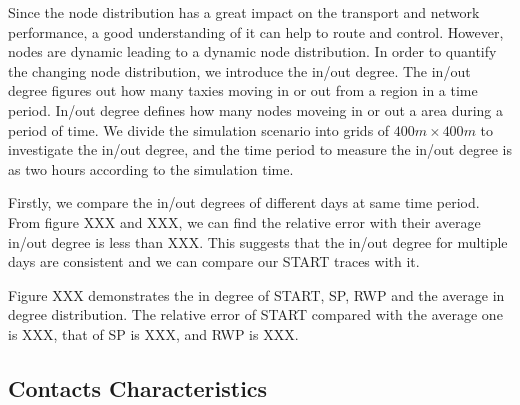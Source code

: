 Since the node distribution has a great impact on the transport and network performance, a good understanding of it can help to route and control.  However, nodes are dynamic leading to a dynamic node distribution. In order to quantify the changing node distribution,  we introduce the in/out degree. The in/out degree figures out how many taxies moving in or out from a region in a time period. In/out degree defines how many nodes moveing in or out a area during a period of time. 
We divide the simulation scenario into grids of $ 400m \times 400 m$ to investigate the in/out degree, and the time period to measure the in/out degree is as two hours according to the simulation time. 

Firstly, we compare the in/out degrees of different days at same time period. From figure XXX and XXX, we can find the relative error with their average in/out degree is less than XXX. This suggests     that the in/out degree for multiple days are consistent and we can compare our START traces with it.

Figure XXX demonstrates the in degree of START, SP, RWP and the average in degree distribution. The relative error of START compared with the average one is XXX, that of SP is XXX,  and RWP is XXX.


\subsection{Contacts Characteristics}

